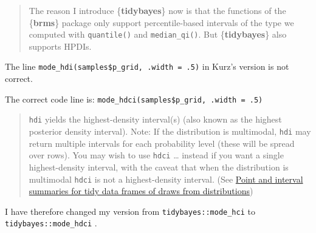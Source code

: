 \documentclass[
  letterpaper,
  DIV=11,
  numbers=noendperiod]{scrreprt}
\newenvironment{Shaded}{\begin{snugshade}}{\end{snugshade}}
\newcommand{\AttributeTok}[1]{\textcolor[rgb]{0.40,0.45,0.13}{#1}}
\newcommand{\CommentTok}[1]{\textcolor[rgb]{0.37,0.37,0.37}{#1}}
\newcommand{\DecValTok}[1]{\textcolor[rgb]{0.68,0.00,0.00}{#1}}
\newcommand{\FunctionTok}[1]{\textcolor[rgb]{0.28,0.35,0.67}{#1}}
\newcommand{\InformationTok}[1]{\textcolor[rgb]{0.37,0.37,0.37}{#1}}
\newcommand{\NormalTok}[1]{\textcolor[rgb]{0.00,0.23,0.31}{#1}}
\newcommand{\SpecialCharTok}[1]{\textcolor[rgb]{0.37,0.37,0.37}{#1}}
\begin{document}
\begin{quote}
The reason I introduce \{\textbf{tidybayes}\} now is that the functions
of the \{\textbf{brms}\} package only support percentile-based intervals
of the type we computed with \texttt{quantile()} and
\texttt{median\_qi()}. But \{\textbf{tidybayes}\} also supports HPDIs.
\end{quote}

\begin{tcolorbox}[enhanced jigsaw, colframe=quarto-callout-warning-color-frame, colback=white, toprule=.15mm, breakable, arc=.35mm, bottomtitle=1mm, colbacktitle=quarto-callout-warning-color!10!white, toptitle=1mm, titlerule=0mm, title=\textcolor{quarto-callout-warning-color}{\faExclamationTriangle}\hspace{0.5em}{Warning}, leftrule=.75mm, opacityback=0, rightrule=.15mm, opacitybacktitle=0.6, bottomrule=.15mm, left=2mm, coltitle=black]

The line \texttt{mode\_hdi(samples\$p\_grid,\ .width\ =\ .5)} in Kurz's
version is not correct.

The correct code line is:
\texttt{mode\_hdci(samples\$p\_grid,\ .width\ =\ .5)}

\begin{quote}
\texttt{hdi} yields the highest-density interval(s) (also known as the
highest posterior density interval). Note: If the distribution is
multimodal, \texttt{hdi} may return multiple intervals for each
probability level (these will be spread over rows). You may wish to use
\texttt{hdci} \ldots{} instead if you want a single highest-density
interval, with the caveat that when the distribution is multimodal
\texttt{hdci} is not a highest-density interval. (See
\href{https://mjskay.github.io/ggdist/reference/point_interval.html}{Point
and interval summaries for tidy data frames of draws from
distributions})
\end{quote}

I have therefore changed my version from \texttt{tidybayes::mode\_hci}
to \texttt{tidybayes::mode\_hdci} .

\end{tcolorbox}

\begin{Shaded}
\end{Shaded}
\end{document}
